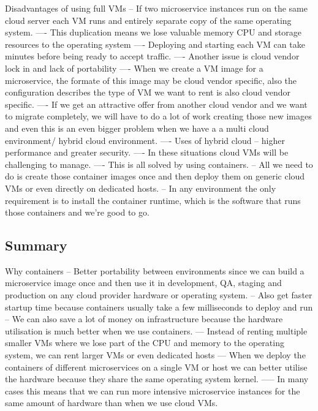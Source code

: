\documentclass[a4paper, 11pt]{book}
\begin{document}
    Disadvantages of using full VMs
    -- If two microservice instances run on the same cloud server each VM runs and entirely separate copy of the same operating system.
    ---- This duplication means we lose valuable memory CPU and storage resources to the operating system
    ---- Deploying and starting each VM can take minutes before being ready to accept traffic.
    ---- Another issue is cloud vendor lock in and lack of portability
    ---- When we create a VM image for a microservice,  the formate of this image may be cloud vendor specific, also the configuration describes the type of VM we want to rent is also cloud vendor specific.
    ---- If we get an attractive offer from another cloud vendor and we want to migrate completely, we will have to do a lot of work creating those new images and even this is an even bigger problem when we have a a multi cloud environment/ hybrid cloud environment.
    ---- Uses of hybrid cloud -- higher performance and greater security.
    ---- In these situations cloud VMs will be challenging to manage.
    ---- This is all solved by using containers.
    -- All we need to do is create those container images once and then deploy them on generic cloud VMs or even directly on dedicated hosts.
    -- In any environment the only requirement is to install the container runtime, which is the software that runs those containers and we're good to go.

    \subsection{Summary}
    Why containers
    -- Better portability between environments since we can build a microservice image once and then use it in development, QA, staging and production on any cloud provider hardware or operating system.
    -- Also get faster startup time because containers usually take a few milliseconds to deploy and run
    -- We can also save a lot of money on infrastructure because the hardware utilisation is much better when we use containers.
    --- Instead of renting multiple smaller VMs where we lose part of the CPU and memory to the operating system, we can rent larger VMs or even dedicated hosts
    --- When we deploy the containers of different microservices on a single VM or host we can better utilise the hardware because they share the same operating system kernel.
    ----- In many cases this means that we can run more intensive microservice instances for the same amount of hardware than when we use cloud VMs.
\end{document}
